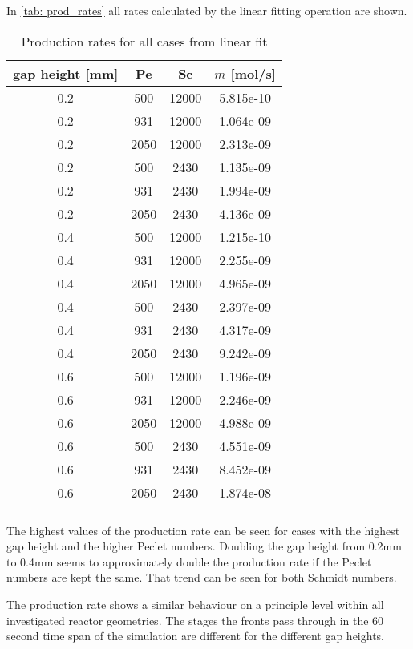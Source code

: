 \documentclass[../thesis.tex]{subfiles}
\begin{document}
In \autoref{tab: prod_rates} all rates calculated by the linear fitting operation are shown.
\begin{table} [htb]
	\centering
	\caption{Production rates for all cases from linear fit}
	\begin{tabular}{ cccc }
		\hline
		gap height [mm] & Pe & Sc & $m$ [mol/s] \\
		\hline
		0.2 & 500 & 12000 & 5.815e-10 \\
		0.2 & 931 & 12000 & 1.064e-09 \\
		0.2 & 2050 & 12000 & 2.313e-09 \\
		0.2	& 500 & 2430 & 1.135e-09 \\
		0.2	& 931 & 2430 & 1.994e-09 \\
		0.2	& 2050 & 2430 & 4.136e-09 \\
		0.4 & 500 & 12000 & 1.215e-10 \\
		0.4 & 931 & 12000 & 2.255e-09 \\
		0.4 & 2050 & 12000 & 4.965e-09 \\
		0.4	& 500 & 2430 & 2.397e-09 \\
		0.4	& 931 & 2430 & 4.317e-09 \\
		0.4	& 2050 & 2430 & 9.242e-09 \\
		0.6 & 500 & 12000 & 1.196e-09 \\
		0.6 & 931 & 12000 & 2.246e-09 \\
		0.6 & 2050 & 12000 & 4.988e-09 \\
		0.6	& 500 & 2430 & 4.551e-09 \\
		0.6	& 931 & 2430 & 8.452e-09 \\
		0.6	& 2050 & 2430 & 1.874e-08 \\
		\hline
		\label{tab: prod_rates}
	\end{tabular}
\end{table}
The highest values of the production rate can be seen for cases with the highest gap height and the higher Peclet numbers. Doubling the gap height from 0.2mm to 0.4mm seems to approximately double the production rate if the Peclet numbers are kept the same. That trend can be seen for both Schmidt numbers.
\newline

The production rate shows a similar behaviour on a principle level within all investigated reactor geometries. The stages the fronts pass through in the 60 second time span of the simulation are different for the different gap heights.
\end{document}
